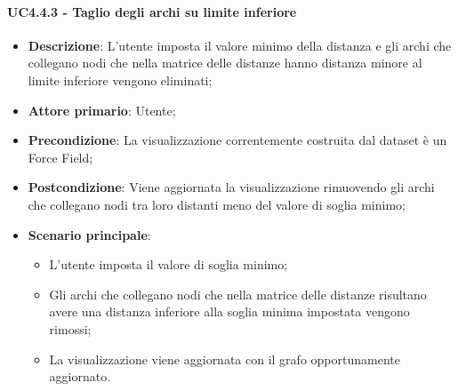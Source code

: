 \paragraph{UC4.4.3 - Taglio degli archi su limite inferiore}
\label{par:uc4.4.3}
\begin{itemize}
    \item \textbf{Descrizione}:     L'utente imposta il valore minimo della distanza e gli archi che collegano nodi che nella matrice delle distanze hanno distanza minore al limite inferiore vengono eliminati;
    \item \textbf{Attore primario}: Utente;
    \item \textbf{Precondizione}:   La visualizzazione correntemente costruita dal dataset è un Force Field;
    \item \textbf{Postcondizione}:  Viene aggiornata la visualizzazione rimuovendo gli archi  che collegano nodi tra loro distanti meno del valore di soglia minimo;
    \item \textbf{Scenario principale}:
    \begin{itemize}
        \item L'utente imposta il valore di soglia minimo;
        \item Gli archi che collegano nodi che nella matrice delle distanze risultano avere una distanza inferiore alla soglia minima impostata vengono rimossi;
        \item La visualizzazione viene aggiornata con il grafo opportunamente aggiornato.
    \end{itemize}
\end{itemize}

